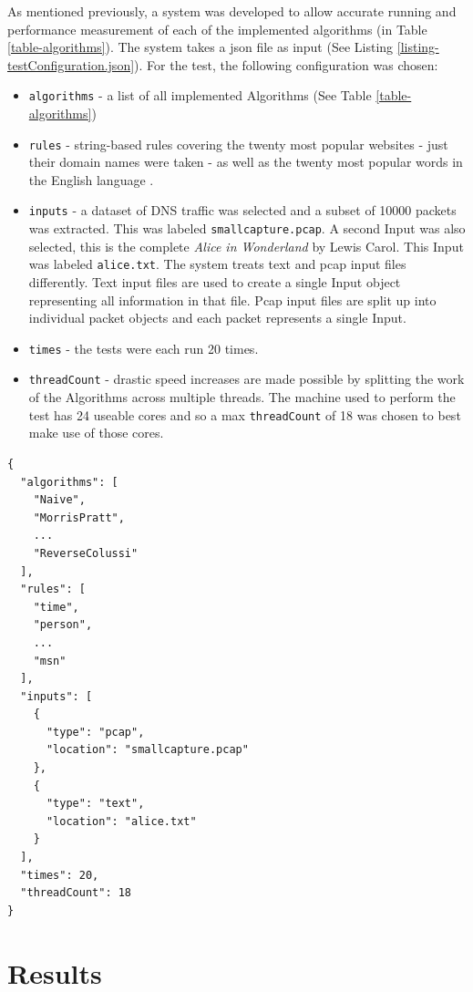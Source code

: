 \documentclass[11pt]{article}
\begin{document}
As mentioned previously, a system was developed to allow accurate running and performance measurement of each of the implemented algorithms (in Table \ref{table-algorithms}). The system takes a json file as input (See Listing \ref{listing-testConfiguration.json}). For the test, the following configuration was chosen:
\begin{itemize}
  \item \texttt{algorithms} - a list of all implemented Algorithms (See Table \ref{table-algorithms}) 
  \item \texttt{rules} - string-based rules covering the twenty most popular websites \citep{alexa2016} - just their domain names were taken - as well as the twenty most popular words in the English language \citep{oed2016}.
  \item \texttt{inputs} - a dataset of DNS traffic was selected and a subset of 10000 packets was extracted. This was labeled \texttt{smallcapture.pcap}. A second Input was also selected, this is the complete \textit{Alice in Wonderland} by Lewis Carol. This Input was labeled \texttt{alice.txt}. The system treats text and pcap input files differently. Text input files are used to create a single Input object representing all information in that file. Pcap input files are split up into individual packet objects and each packet represents a single Input.
  \item \texttt{times} - the tests were each run 20 times.
  \item \texttt{threadCount} - drastic speed increases are made possible by splitting the work of the Algorithms across multiple threads. The machine used to perform the test has 24 useable cores and so a max \texttt{threadCount} of 18 was chosen to best make use of those cores.
\end{itemize}


\begin{lstlisting}[caption = {Sample testConfiguration.json}, label = {listing-testConfiguration.json}]
{
  "algorithms": [
    "Naive",
    "MorrisPratt",
    ...
    "ReverseColussi"
  ],
  "rules": [
    "time",
    "person",
    ...
    "msn"
  ],
  "inputs": [
    {
      "type": "pcap",
      "location": "smallcapture.pcap"
    },
    {
      "type": "text",
      "location": "alice.txt"
    }
  ],
  "times": 20,
  "threadCount": 18
}
\end{lstlisting}

\section{Results}
\end{document}
